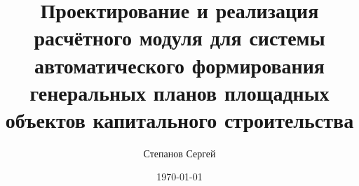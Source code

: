 

\title[ВКР]{
	Проектирование и реализация расчётного модуля для системы автоматического формирования
	генеральных планов площадных объектов капитального строительства
}


\author[Author]{Степанов Сергей}


\date{\today}

\subject{Генеральный план}


\begin{frame}[plain]
\end{frame}
